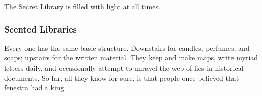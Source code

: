 \begin{multicols}{2}
\begin{description}
  The Secret Library is filled with light at all times.
  \fi
\end{description}

\subsubsection{Scented Libraries}

Every one has the same basic structure.
Downstairs for candles, perfumes, and soaps; upstairs for the written material.
They keep and make maps, write myriad letters daily, and occasionally attempt to unravel the web of lies in historical documents.
So far, all they know for sure, is that people once believed that \gls{fenestra} had a king.

\end{multicols}

